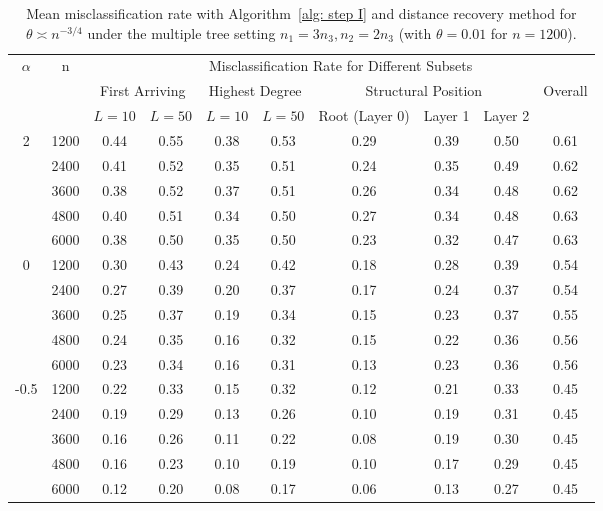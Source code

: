 \begin{table}[tbp]
\setlength{\tabcolsep}{3.5pt}

\centering

{
\begin{tabular}{c|c|cc|cc|ccc|c}
\hline
\hline
\multirow{3}{*}{$\alpha$} & \multirow{3}{*}{n}
& \multicolumn{8}{c}{Misclassification Rate for Different Subsets} \\
\cline{3-10}
& 
& \multicolumn{2}{c|}{First Arriving}
& \multicolumn{2}{c|}{Highest Degree}
& \multicolumn{3}{c|}{Structural Position}
& \multirow{2}{*}{Overall} \\
\cline{3-9}
& 
& $L=10$ & $L=50$
& $L=10$ & $L=50$
& Root (Layer 0) & Layer 1 & Layer 2
& \\
\hline
\multirow{5}{*}{2}
& 1200 & 0.44 & 0.55 & 0.38 & 0.53 & 0.29 & 0.39 & 0.50 & 0.61 \\
& 2400 & 0.41 & 0.52 & 0.35 & 0.51 & 0.24 & 0.35 & 0.49 & 0.62 \\
& 3600 & 0.38 & 0.52 & 0.37 & 0.51 & 0.26 & 0.34 & 0.48 & 0.62 \\
& 4800 & 0.40 & 0.51 & 0.34 & 0.50 & 0.27 & 0.34 & 0.48 & 0.63 \\
& 6000 & 0.38 & 0.50 & 0.35 & 0.50 & 0.23 & 0.32 & 0.47 & 0.63 \\
\hline
\multirow{5}{*}{0}
& 1200 & 0.30 & 0.43 & 0.24 & 0.42 & 0.18 & 0.28 & 0.39 & 0.54 \\
& 2400 & 0.27 & 0.39 & 0.20 & 0.37 & 0.17 & 0.24 & 0.37 & 0.54 \\
& 3600 & 0.25 & 0.37 & 0.19 & 0.34 & 0.15 & 0.23 & 0.37 & 0.55 \\
& 4800 & 0.24 & 0.35 & 0.16 & 0.32 & 0.15 & 0.22 & 0.36 & 0.56 \\
& 6000 & 0.23 & 0.34 & 0.16 & 0.31 & 0.13 & 0.23 & 0.36 & 0.56 \\
\hline
\multirow{5}{*}{-0.5}
& 1200 & 0.22 & 0.33 & 0.15 & 0.32 & 0.12 & 0.21 & 0.33 & 0.45 \\
& 2400 & 0.19 & 0.29 & 0.13 & 0.26 & 0.10 & 0.19 & 0.31 & 0.45 \\
& 3600 & 0.16 & 0.26 & 0.11 & 0.22 & 0.08 & 0.19 & 0.30 & 0.45 \\
& 4800 & 0.16 & 0.23 & 0.10 & 0.19 & 0.10 & 0.17 & 0.29 & 0.45 \\
& 6000 & 0.12 & 0.20 & 0.08 & 0.17 & 0.06 & 0.13 & 0.27 & 0.45 \\
\hline
\hline
\end{tabular}
}


\caption{Mean misclassification rate with Algorithm~\ref{alg: step I} and distance recovery method for $\theta \asymp n^{-3/4}$ under the multiple tree setting $n_1 = 3 n_3, n_2=2 n_3$ (with $\theta=0.01$ for $n=1200$).}
\label{tab:mean_error_scale_n34 3}
\end{table}